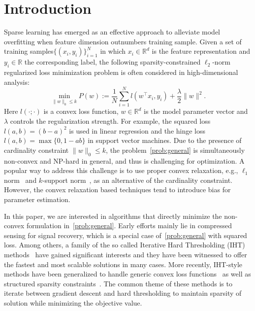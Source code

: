 \documentclass[11pt]{article}
\numberwithin{equation}{section}
\numberwithin{table}{section}
\numberwithin{figure}{section}
\begin{document}
\section{Introduction}
Sparse learning has emerged as an effective approach to alleviate model overfitting when feature dimension outnumbers training sample. Given a set of training samples$\{(x_i, y_i)\}_{i=1}^N$ in which $x_i\in \mathbb{R}^d$ is the feature representation and $y_i\in \mathbb{R}$ the corresponding label, the following sparsity-constrained $\ell_2$-norm regularized loss minimization problem is often considered in high-dimensional analysis:
\begin{equation}\label{prob:general}
\min_{\|w\|_0 \le k} P(w):= \frac{1}{N}\sum\limits_{i=1}^N l(w^\top x_i,y_i) + \frac{\lambda}{2} \|w\|^2.
\end{equation}
Here $l(\cdot;\cdot)$ is a convex loss function, $w\in \mathbb{R}^d$ is the model parameter vector and $\lambda$ controls the regularization strength. For example, the squared loss $l(a,b)=(b-a)^2$ is used in linear regression and the hinge loss $l(a,b)=\max\{0,1-ab\}$ in support vector machines. Due to the presence of cardinality constraint $\|w\|_0\le k$, the problem~\eqref{prob:general} is simultaneously non-convex and NP-hard in general, and thus is challenging for optimization. A popular way to address this challenge is to use proper convex relaxation, e.g., $\ell_1$ norm~\citep{tibshirani1996regression} and $k$-support norm~\citep{argyriou2012sparse}, as an alternative of the cardinality constraint. However, the convex relaxation based techniques tend to introduce bias for parameter estimation.

In this paper, we are interested in algorithms that directly minimize the non-convex formulation in~\eqref{prob:general}. Early efforts mainly lie in compressed sensing for signal recovery, which is a special case of~\eqref{prob:general} with squared loss. Among others, a family of the so called Iterative Hard Thresholding (IHT) methods~\citep{blumensath2009iterative,foucart2011hard} have gained significant interests and they have been witnessed to offer the fastest and most scalable solutions in many cases. More recently, IHT-style methods have been generalized to handle generic convex loss functions~\citep{beck2013sparsity,Yuan-ICML-2014,jain2014iterative} as well as structured sparsity constraints~\citep{jain2016structured}. The common theme of these methods is to iterate between gradient descent and hard thresholding to maintain sparsity of solution while minimizing the objective value.
\end{document}
